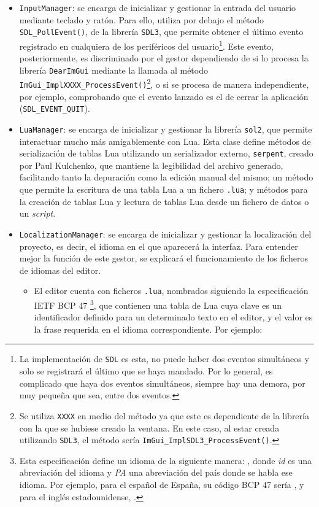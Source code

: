 \begin{itemize}
	\item \texttt{InputManager}: se encarga de inicializar y gestionar la entrada del usuario mediante teclado y ratón. Para ello, utiliza por debajo el método \texttt{SDL\_PollEvent()}, de la librería \texttt{SDL3}, que permite obtener el último evento registrado en cualquiera de los periféricos del usuario\footnote{La implementación de \texttt{SDL} es esta, no puede haber dos eventos simultáneos y solo se registrará el último que se haya mandado. Por lo general, es complicado que haya dos eventos simultáneos, siempre hay una demora, por muy pequeña que sea, entre dos eventos.}. Este evento, posteriormente, es discriminado por el gestor dependiendo de si lo procesa la librería \texttt{DearImGui} mediante la llamada al método \texttt{ImGui\_ImplXXXX\_ProcessEvent()}\footnote{Se utiliza \texttt{XXXX} en medio del método ya que este es dependiente de la librería con la que se hubiese creado la ventana. En este caso, al estar creada utilizando \texttt{SDL3}, el método sería \texttt{ImGui\_ImplSDL3\_ProcessEvent()}.}, o si se procesa de manera independiente, por ejemplo, comprobando que el evento lanzado es el de cerrar la aplicación (\texttt{SDL\_EVENT\_QUIT}).
	\item \texttt{LuaManager}: se encarga de inicializar y gestionar la librería \texttt{sol2}, que permite interactuar mucho más amigablemente con Lua. Esta clase define métodos de serialización de tablas Lua utilizando un serializador externo, \texttt{serpent}, creado por Paul Kulchenko, que mantiene la legibilidad del archivo generado, facilitando tanto la depuración como la edición manual del mismo; un método que permite la escritura de una tabla Lua a un fichero \texttt{.lua}; y métodos para la creación de tablas Lua y lectura de tablas Lua desde un fichero de datos o un \textit{script}.
	\item \texttt{LocalizationManager}: se encarga de inicializar y gestionar la localización del proyecto, es decir, el idioma en el que aparecerá la interfaz. Para entender mejor la función de este gestor, se explicará el funcionamiento de los ficheros de idiomas del editor.
	\begin{itemize}
		\item El editor cuenta con ficheros \texttt{.lua}, nombrados siguiendo la especificación IETF BCP 47 \citep{rfc5646}\footnote{Esta especificación define un idioma de la siguiente manera: , donde \textit{id} es una abreviación del idioma y \textit{PA} una abreviación del país donde se habla ese idioma. Por ejemplo, para el español de España, su código BCP 47 sería , y para el inglés estadounidense, .}, que contienen una tabla de Lua cuya clave es un identificador definido para un determinado texto en el editor, y el valor es la frase requerida en el idioma correspondiente. Por ejemplo:

\end{itemize}
\end{itemize}
